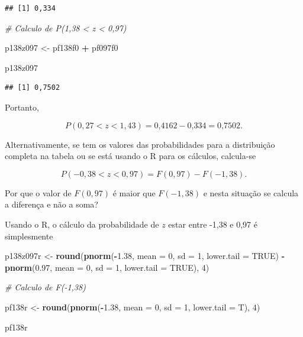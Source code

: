 \documentclass[
]{book}
\newenvironment{Shaded}{\begin{snugshade}}{\end{snugshade}}
\newcommand{\CommentTok}[1]{\textcolor[rgb]{0.56,0.35,0.01}{\textit{#1}}}
\newcommand{\DataTypeTok}[1]{\textcolor[rgb]{0.13,0.29,0.53}{#1}}
\newcommand{\DecValTok}[1]{\textcolor[rgb]{0.00,0.00,0.81}{#1}}
\newcommand{\FloatTok}[1]{\textcolor[rgb]{0.00,0.00,0.81}{#1}}
\newcommand{\KeywordTok}[1]{\textcolor[rgb]{0.13,0.29,0.53}{\textbf{#1}}}
\newcommand{\NormalTok}[1]{#1}
\newcommand{\OperatorTok}[1]{\textcolor[rgb]{0.81,0.36,0.00}{\textbf{#1}}}
\newcommand{\OtherTok}[1]{\textcolor[rgb]{0.56,0.35,0.01}{#1}}
\newcommand{\StringTok}[1]{\textcolor[rgb]{0.31,0.60,0.02}{#1}}
\begin{document}
\begin{verbatim}
## [1] 0,334
\end{verbatim}

\begin{Shaded}
\begin{Highlighting}[]
\CommentTok{# Calculo de P(1,38 < z < 0,97)}

\NormalTok{p138z097 <-}\StringTok{ }\NormalTok{pf138f0 }\OperatorTok{+}\StringTok{ }\NormalTok{pf097f0}

\NormalTok{p138z097}
\end{Highlighting}
\end{Shaded}

\begin{verbatim}
## [1] 0,7502
\end{verbatim}

Portanto,

\[
  P(0,27 < z < 1,43) = \text{0,4162} - \text{0,334} = \text{0,7502}.
\]

Alternativamente, se tem os valores das probabilidades para a distribuição completa na tabela ou se está usando o R para os cálculos, calcula-se

\[
  P(-0,38 < z < 0,97) = F(0,97) - F(-1,38).
\]

Por que o valor de \(F(0,97)\) é maior que \(F(-1,38)\) e nesta situação se calcula a diferença e não a soma?

Usando o R, o cálculo da probabilidade de \(z\) estar entre -1,38 e 0,97 é simplesmente

\begin{Shaded}
\begin{Highlighting}[]
\NormalTok{p138z097r <-}\StringTok{ }\KeywordTok{round}\NormalTok{(}\KeywordTok{pnorm}\NormalTok{(}\OperatorTok{-}\FloatTok{1.38}\NormalTok{, }\DataTypeTok{mean =} \DecValTok{0}\NormalTok{, }\DataTypeTok{sd =} \DecValTok{1}\NormalTok{, }\DataTypeTok{lower.tail =} \OtherTok{TRUE}\NormalTok{) }\OperatorTok{-}\StringTok{ }
\StringTok{    }\KeywordTok{pnorm}\NormalTok{(}\FloatTok{0.97}\NormalTok{, }\DataTypeTok{mean =} \DecValTok{0}\NormalTok{, }\DataTypeTok{sd =} \DecValTok{1}\NormalTok{, }\DataTypeTok{lower.tail =} \OtherTok{TRUE}\NormalTok{), }
    \DecValTok{4}\NormalTok{)}

\CommentTok{# Calculo de F(-1,38)}

\NormalTok{pf138r <-}\StringTok{ }\KeywordTok{round}\NormalTok{(}\KeywordTok{pnorm}\NormalTok{(}\OperatorTok{-}\FloatTok{1.38}\NormalTok{, }\DataTypeTok{mean =} \DecValTok{0}\NormalTok{, }\DataTypeTok{sd =} \DecValTok{1}\NormalTok{, }\DataTypeTok{lower.tail =}\NormalTok{ T), }
    \DecValTok{4}\NormalTok{)}

\NormalTok{pf138r}
\end{Highlighting}
\end{Shaded}
\end{document}
